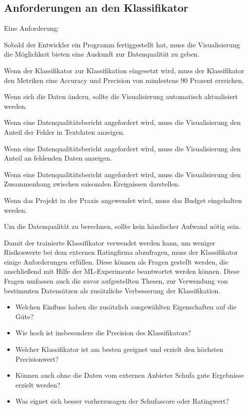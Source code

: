 \subsection{Anforderungen an den Klassifikator}

Eine Anforderung: 

Sobald der Entwickler ein Programm fertiggestellt hat, muss die Visualisierung die Möglichkeit bieten eine Auskunft zur Datenqualität zu geben.

Wenn der Klassifikator zur Klassifikation eingesetzt wird, muss der Klassifikator den Metriken eine Accuracy und Precision von mindestens 90 Prozent erreichen. 

Wenn sich die Daten ändern, sollte die Visualisierung automatisch aktualisiert werden.

Wenn eine Datenqualitätsbericht angefordert wird, muss die Visualisierung den Anteil der Fehler in Textdaten anzeigen.

Wenn eine Datenqualitätsbericht angefordert wird, muss die Visualisierung den Anteil an fehlenden Daten anzeigen. 

Wenn eine Datenqualitätsbericht angefordert wird, muss die Visualisierung den Zusammenhang zwischen saisonalen Ereignissen darstellen. 

Wenn das Projekt in der Praxis angewendet wird, muss das Budget eingehalten werden. 

Um die Datenqualität zu berechnen, sollte kein händischer Aufwand nötig sein. 


Damit der trainierte Klassifikator verwendet werden kann, um weniger Risikoswerte bei dem externen Ratingfirma abzufragen, muss der Klassifikator einige Anforderungen erfüllen.
Diese können als Fragen gestellt werden, die anschließend mit Hilfe der ML-Experimente beantwortet werden können. 
Diese Fragen umfassen auch die zuvor aufgestellten Thesen, zur Verwendung von bestimmten Datensätzen als zusätzliche Verbesserung der Klassifikation. 

\begin{itemize}
 \item Welchen Einfluss haben die zusätzlich ausgewählten Eigenschaften auf die Güte?
 \item Wie hoch ist insbesondere die Precision des Klassifikators?
 \item Welcher Klassifikator ist am besten geeignet und erzielt den höchsten Precisionwert?
 \item Können auch ohne die Daten vom externen Anbieter Schufa gute Ergebnisse erzielt werden?
 \item Was eignet sich besser vorherzusagen der Schufascore oder Ratingwert?
\end{itemize}



